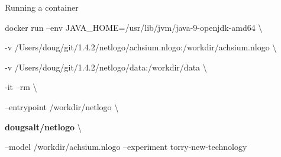 \documentclass[usenames,dvipsnames,10pt]{beamer}
\begin{document}
\begin{frame}{Running a container}

    \small
    \vfill
    docker run {\color{orange} –env JAVA\_HOME=/usr/lib/jvm/java-9-openjdk-amd64} \textbackslash

    {\color{magenta}-v /Users/doug/git/1.4.2/netlogo/achsium.nlogo:/workdir/achsium.nlogo} \textbackslash

    {\color{magenta}-v /Users/doug/git/1.4.2/netlogo/data:/workdir/data} \textbackslash

    {\color{green}-it --rm} \textbackslash

    {\color{purple}--entrypoint /workdir/netlogo} \textbackslash

    \textbf{dougsalt/netlogo} \textbackslash

    {\color{blue}--model /workdir/achsium.nlogo --experiment torry-new-technology}

    \normalsize
    \vfill
\end{frame}
\end{document}
